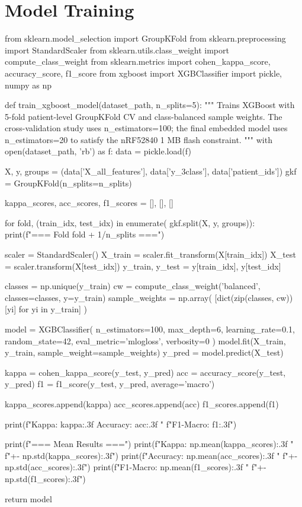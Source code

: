 \section{Model Training}
\label{app:training}

\begin{pycode}
from sklearn.model_selection import GroupKFold
from sklearn.preprocessing import StandardScaler
from sklearn.utils.class_weight import compute_class_weight
from sklearn.metrics import cohen_kappa_score, accuracy_score, f1_score
from xgboost import XGBClassifier
import pickle, numpy as np

def train_xgboost_model(dataset_path, n_splits=5):
    """
    Trains XGBoost with 5-fold patient-level GroupKFold CV and
    class-balanced sample weights.  The cross-validation study uses
    n_estimators=100; the final embedded model uses n_estimators=20
    to satisfy the nRF52840 1 MB flash constraint.
    """
    with open(dataset_path, 'rb') as f:
        data = pickle.load(f)

    X, y, groups = (data['X_all_features'],
                    data['y_3class'],
                    data['patient_ids'])
    gkf = GroupKFold(n_splits=n_splits)

    kappa_scores, acc_scores, f1_scores = [], [], []

    for fold, (train_idx, test_idx) in enumerate(
            gkf.split(X, y, groups)):
        print(f"\n=== Fold {fold + 1}/{n_splits} ===")

        scaler  = StandardScaler()
        X_train = scaler.fit_transform(X[train_idx])
        X_test  = scaler.transform(X[test_idx])
        y_train, y_test = y[train_idx], y[test_idx]

        classes = np.unique(y_train)
        cw = compute_class_weight('balanced',
                                  classes=classes, y=y_train)
        sample_weights = np.array(
            [dict(zip(classes, cw))[yi] for yi in y_train]
        )

        model = XGBClassifier(
            n_estimators=100,
            max_depth=6,
            learning_rate=0.1,
            random_state=42,
            eval_metric='mlogloss',
            verbosity=0
        )
        model.fit(X_train, y_train, sample_weight=sample_weights)
        y_pred = model.predict(X_test)

        kappa = cohen_kappa_score(y_test, y_pred)
        acc   = accuracy_score(y_test, y_pred)
        f1    = f1_score(y_test, y_pred, average='macro')

        kappa_scores.append(kappa)
        acc_scores.append(acc)
        f1_scores.append(f1)

        print(f"Kappa: {kappa:.3f}  Accuracy: {acc:.3f}  "
              f"F1-Macro: {f1:.3f}")

    print(f"\n=== Mean Results ===")
    print(f"Kappa:    {np.mean(kappa_scores):.3f} "
          f"+- {np.std(kappa_scores):.3f}")
    print(f"Accuracy: {np.mean(acc_scores):.3f} "
          f"+- {np.std(acc_scores):.3f}")
    print(f"F1-Macro: {np.mean(f1_scores):.3f} "
          f"+- {np.std(f1_scores):.3f}")

    return model
\end{pycode}


